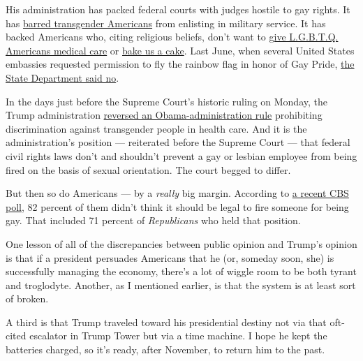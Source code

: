His administration has packed federal courts with judges hostile to gay
rights. It has
\href{https://www.nbcnews.com/feature/nbc-out/trump-s-controversial-transgender-military-policy-goes-effect-n993826}{barred
transgender Americans} from enlisting in military service. It has backed
Americans who, citing religious beliefs, don't want to
\href{https://www.nytimes3xbfgragh.onion/2019/05/02/upshot/conscience-rule-trump-religious-exemption-health-care.html}{give
L.G.B.T.Q. Americans medical care} or
\href{https://www.washingtonpost.com/politics/courts_law/in-major-supreme-court-case-justice-dept-sides-with-baker-who-refused-to-make-wedding-cake-for-gay-couple/2017/09/07/fb84f116-93f0-11e7-89fa-bb822a46da5b_story.html?utm_term=.b9009191c100}{bake
us a cake}. Last June, when several United States embassies requested
permission to fly the rainbow flag in honor of Gay Pride,
\href{https://www.nbcnews.com/politics/national-security/trump-admin-tells-u-s-embassies-they-can-t-fly-n1015236}{the
State Department said no}.

In the days just before the Supreme Court's historic ruling on Monday,
the Trump administration
\href{https://www.nytimes3xbfgragh.onion/2020/06/12/us/politics/trump-transgender-rights.html}{reversed
an Obama-administration rule} prohibiting discrimination against
transgender people in health care. And it is the administration's
position --- reiterated before the Supreme Court --- that federal civil
rights laws don't and shouldn't prevent a gay or lesbian employee from
being fired on the basis of sexual orientation. The court begged to
differ.

But then so do Americans --- by a \emph{really} big margin. According to
\href{https://www.cbsnews.com/news/supreme-court-opinion-poll-cbs-news/}{a
recent CBS poll}, 82 percent of them didn't think it should be legal to
fire someone for being gay. That included 71 percent of
\emph{Republicans} who held that position.

One lesson of all of the discrepancies between public opinion and
Trump's opinion is that if a president persuades Americans that he (or,
someday soon, she) is successfully managing the economy, there's a lot
of wiggle room to be both tyrant and troglodyte. Another, as I mentioned
earlier, is that the system is at least sort of broken.

A third is that Trump traveled toward his presidential destiny not via
that oft-cited escalator in Trump Tower but via a time machine. I hope
he kept the batteries charged, so it's ready, after November, to return
him to the past.

